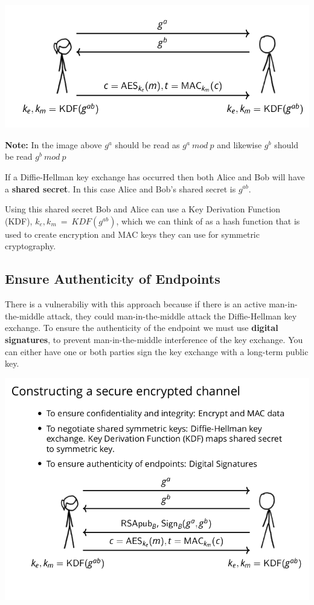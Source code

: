 \documentclass[11pt]{article} %
\begin{document}
\begin{center}
	\includegraphics[scale=.7]{./tls2.png}
\end{center}

{\parindent0pt \textbf{Note:} In the image above $g^{a}$  should be read as 
$g^{a}\ mod\ p$ and likewise $g^{b}$ should be read $g^{b}\ mod\ p$}

\bigskip
{\parindent0pt If a Diffie-Hellman key exchange has occurred then both Alice 
and Bob will have a \textbf{shared secret}. In this case Alice and Bob's shared
secret is $g^{ab}$.}

\bigskip
{\parindent0pt Using this shared secret Bob and Alice can use a Key Derivation
Function (KDF), 
\smallskip
$k_e, k_m\ =\ KDF(g^{ab})$, which we can think of as a hash function that is 
used to create encryption and MAC keys they can use for symmetric cryptography.}

\newpage
\subsection{Ensure Authenticity of Endpoints}
There is a vulnerabiliy with this approach because if there is an active
man-in-the-middle attack, they could man-in-the-middle attack the Diffie-Hellman
key exchange.  To ensure the authenticity of the endpoint we must use
\textbf{digital signatures}, to prevent man-in-the-middle interference of the
key exchange.
\smallskip
You can either have one or both parties sign the key exchange with a long-term
public key.

\includegraphics[scale=.7]{./tls3.png}
\end{document}
